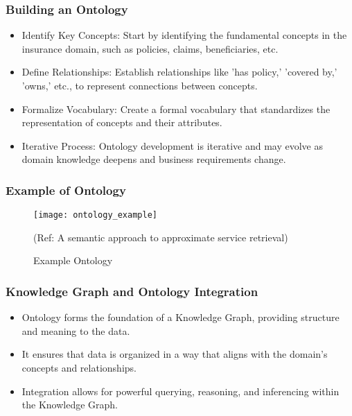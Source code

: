 \begin{frame}[fragile]
\frametitle{Building an Ontology}
\begin{itemize}
\item Identify Key Concepts: Start by identifying the fundamental concepts in the insurance domain, such as policies, claims, beneficiaries, etc.
\item Define Relationships: Establish relationships like 'has policy,' 'covered by,' 'owns,' etc., to represent connections between concepts.
\item Formalize Vocabulary: Create a formal vocabulary that standardizes the representation of concepts and their attributes.
\item Iterative Process: Ontology development is iterative and may evolve as domain knowledge deepens and business requirements change.
\end{itemize}
\end{frame}

\begin{frame}[fragile]
\frametitle{Example of Ontology}
\begin{figure}[h]
\centering
\texttt{[image: ontology\_example]}
\caption{Example Ontology}

{\tiny (Ref: A semantic approach to approximate service retrieval)}
\end{figure}
\end{frame}

\begin{frame}[fragile]
\frametitle{Knowledge Graph and Ontology Integration}
\begin{itemize}
\item Ontology forms the foundation of a Knowledge Graph, providing structure and meaning to the data.
\item It ensures that data is organized in a way that aligns with the domain's concepts and relationships.
\item Integration allows for powerful querying, reasoning, and inferencing within the Knowledge Graph.
\end{itemize}
\end{frame}


